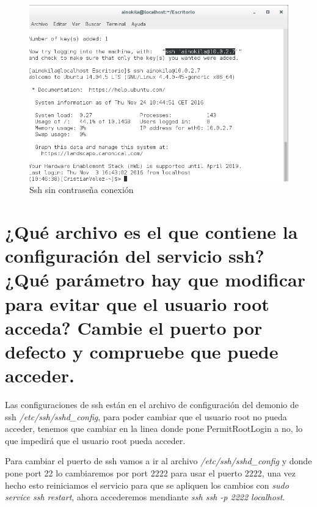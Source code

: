 	\begin{figure}[H]
	\centering
	\includegraphics[scale=0.35]{pics/ssh_conect.png}  
	\caption{Ssh sin contraseña conexión} \label{fig:ssh_conect}
\end{figure}



\section[Cuestión 7]{ ¿Qué archivo es el que contiene la configuración del servicio ssh? ¿Qué parámetro hay que modificar para evitar que el usuario root acceda? Cambie el puerto por defecto y compruebe que puede acceder.}

Las configuraciones de ssh están en el archivo de configuración del demonio de ssh \textit{/etc/ssh/sshd\_config}, para poder cambiar que el usuario root no pueda acceder, tenemos que cambiar en la linea donde pone PermitRootLogin a no, lo que impedirá que el usuario root pueda acceder.

Para cambiar el puerto de ssh vamos a ir al archivo \textit{/etc/ssh/sshd\_config} y donde pone port 22 lo cambiaremos por port 2222 para usar el puerto 2222, una vez hecho esto reiniciamos el servicio para que se apliquen los cambios con \textit{sudo service ssh restart}, ahora accederemos mendiante \textit{ssh ssh -p 2222 localhost}.\cite{key}


